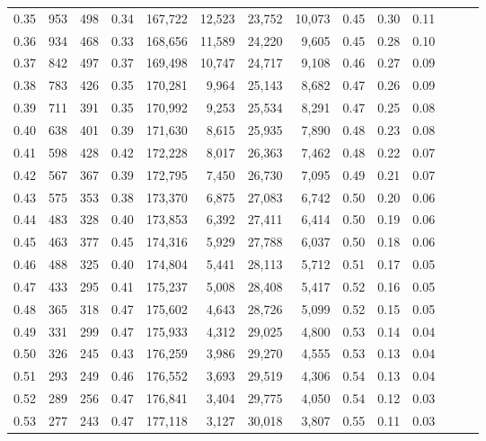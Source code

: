 \begin{tabular}{rrrrrrrrrrrrrr}
0.35 &     953 &  498 &  0.34 &  167,722 &   12,523 &  23,752 &  10,073 &  0.45 &  0.30 &      0.11 \\
0.36 &     934 &  468 &  0.33 &  168,656 &   11,589 &  24,220 &   9,605 &  0.45 &  0.28 &      0.10 \\
0.37 &     842 &  497 &  0.37 &  169,498 &   10,747 &  24,717 &   9,108 &  0.46 &  0.27 &      0.09 \\
0.38 &     783 &  426 &  0.35 &  170,281 &    9,964 &  25,143 &   8,682 &  0.47 &  0.26 &      0.09 \\
0.39 &     711 &  391 &  0.35 &  170,992 &    9,253 &  25,534 &   8,291 &  0.47 &  0.25 &      0.08 \\
0.40 &     638 &  401 &  0.39 &  171,630 &    8,615 &  25,935 &   7,890 &  0.48 &  0.23 &      0.08 \\
0.41 &     598 &  428 &  0.42 &  172,228 &    8,017 &  26,363 &   7,462 &  0.48 &  0.22 &      0.07 \\
0.42 &     567 &  367 &  0.39 &  172,795 &    7,450 &  26,730 &   7,095 &  0.49 &  0.21 &      0.07 \\
0.43 &     575 &  353 &  0.38 &  173,370 &    6,875 &  27,083 &   6,742 &  0.50 &  0.20 &      0.06 \\
0.44 &     483 &  328 &  0.40 &  173,853 &    6,392 &  27,411 &   6,414 &  0.50 &  0.19 &      0.06 \\
0.45 &     463 &  377 &  0.45 &  174,316 &    5,929 &  27,788 &   6,037 &  0.50 &  0.18 &      0.06 \\
0.46 &     488 &  325 &  0.40 &  174,804 &    5,441 &  28,113 &   5,712 &  0.51 &  0.17 &      0.05 \\
0.47 &     433 &  295 &  0.41 &  175,237 &    5,008 &  28,408 &   5,417 &  0.52 &  0.16 &      0.05 \\
0.48 &     365 &  318 &  0.47 &  175,602 &    4,643 &  28,726 &   5,099 &  0.52 &  0.15 &      0.05 \\
0.49 &     331 &  299 &  0.47 &  175,933 &    4,312 &  29,025 &   4,800 &  0.53 &  0.14 &      0.04 \\
0.50 &     326 &  245 &  0.43 &  176,259 &    3,986 &  29,270 &   4,555 &  0.53 &  0.13 &      0.04 \\
0.51 &     293 &  249 &  0.46 &  176,552 &    3,693 &  29,519 &   4,306 &  0.54 &  0.13 &      0.04 \\
0.52 &     289 &  256 &  0.47 &  176,841 &    3,404 &  29,775 &   4,050 &  0.54 &  0.12 &      0.03 \\
0.53 &     277 &  243 &  0.47 &  177,118 &    3,127 &  30,018 &   3,807 &  0.55 &  0.11 &      0.03 \\

\end{tabular}
